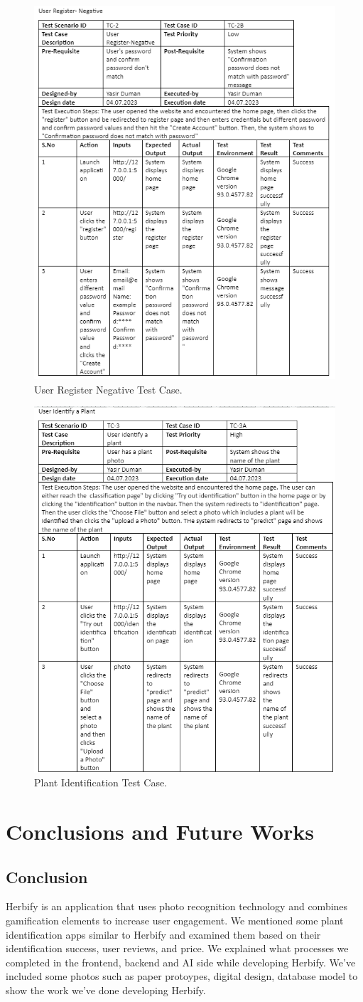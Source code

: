 \documentclass[conference]{IEEEtran}
\begin{document}
\begin{figure}[H]
\centerline{\includegraphics[width=0.48 \textwidth]{images/userRegisterNegativeTestCase11.png}}
\caption{User Register Negative Test Case.}
\label{fig:graph5}
\end{figure}


\begin{figure}[H]
\centerline{\includegraphics[width=0.48 \textwidth]{images/identifyPlantTestCase11.png}}
\caption{Plant Identification Test Case.}
\label{fig:graph5}
\end{figure}


\section{Conclusions and Future Works}
\subsection{Conclusion}
 Herbify is an application that uses photo recognition technology and combines gamification elements to increase user engagement. We mentioned some plant identification apps similar to Herbify and examined them based on their identification success, user reviews, and price. We explained what processes we completed in the frontend, backend and AI side while developing Herbify.  We've included some photos such as paper protoypes, digital design, database model to show the work we've done developing Herbify. \newline
\end{document}
